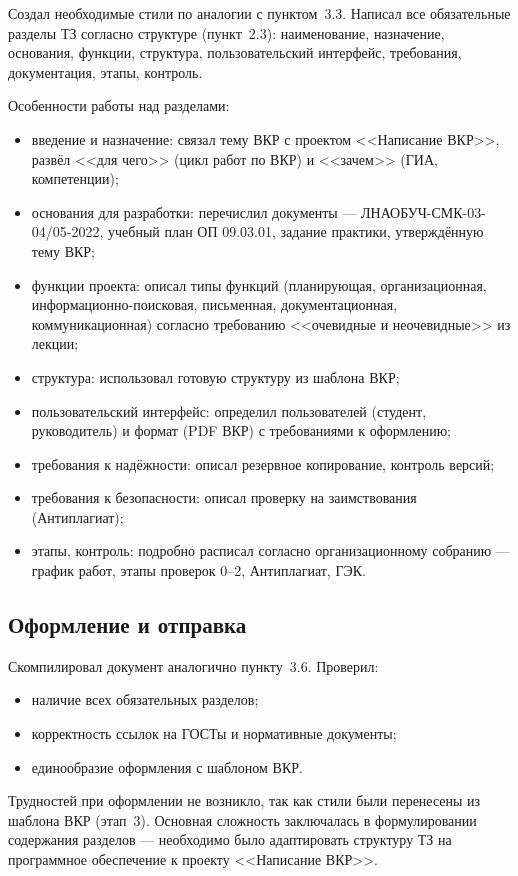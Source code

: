 \documentclass[a4paper,14pt]{extarticle}
\begin{document}
Создал необходимые стили по аналогии с пунктом~3.3. Написал все обязательные разделы ТЗ согласно структуре (пункт~2.3): наименование, назначение, основания, функции, структура, пользовательский интерфейс, требования, документация, этапы, контроль.

Особенности работы над разделами:
\begin{itemize}
  \item введение и назначение: связал тему ВКР с проектом <<Написание ВКР>>, развёл <<для чего>> (цикл работ по ВКР) и <<зачем>> (ГИА, компетенции);
  \item основания для разработки: перечислил документы --- ЛНАОБУЧ-СМК-03-04/05-2022, учебный план ОП 09.03.01, задание практики, утверждённую тему ВКР;
  \item функции проекта: описал типы функций (планирующая, организационная, информационно-поисковая, письменная, документационная, коммуникационная) согласно требованию <<очевидные и неочевидные>> из лекции;
  \item структура: использовал готовую структуру из шаблона ВКР;
  \item пользовательский интерфейс: определил пользователей (студент, руководитель) и формат (PDF ВКР) с требованиями к оформлению;
  \item требования к надёжности: описал резервное копирование, контроль версий;
  \item требования к безопасности: описал проверку на заимствования (Антиплагиат);
  \item этапы, контроль: подробно расписал согласно организационному собранию --- график работ, этапы проверок 0--2, Антиплагиат, ГЭК.
\end{itemize}

\subsection{Оформление и отправка}

Скомпилировал документ аналогично пункту~3.6. Проверил:
\begin{itemize}
  \item наличие всех обязательных разделов;
  \item корректность ссылок на ГОСТы и нормативные документы;
  \item единообразие оформления с шаблоном ВКР.
\end{itemize}

Трудностей при оформлении не возникло, так как стили были перенесены из шаблона ВКР (этап~3). Основная сложность заключалась в формулировании содержания разделов --- необходимо было адаптировать структуру ТЗ на программное обеспечение к проекту <<Написание ВКР>>.
\end{document}
